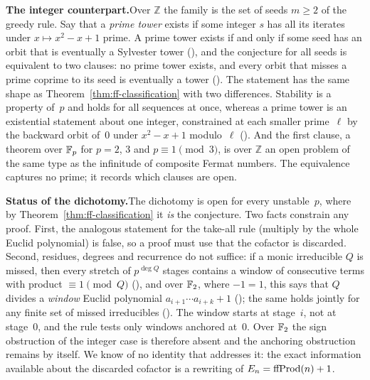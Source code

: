 \smallskip\noindent\textbf{The integer counterpart.}\enspace Over
$\mathbb Z$ the family is the set of seeds $m\ge 2$ of the greedy rule.
Say that a \emph{prime tower} exists if some integer $s$ has all its
iterates under $x\mapsto x^2-x+1$ prime.  A prime tower exists if and
only if some seed has an orbit that is eventually a Sylvester tower
(),
and the conjecture for all seeds is equivalent to two clauses: no prime
tower exists, and every orbit that misses a prime coprime to its seed is
eventually a tower
().
The statement has the same shape as
Theorem~\ref{thm:ff-classification} with two differences.  Stability is a
property of~$p$ and holds for all sequences at once, whereas a prime
tower is an existential statement about one integer, constrained at each
smaller prime~$\ell$ by the backward orbit of~$0$ under $x^2-x+1$
modulo~$\ell$
().
And the first clause, a theorem over $\mathbb{F}_p$ for $p=2$, $3$ and
$p\equiv 1\pmod 3$, is over $\mathbb Z$ an open problem of the same type
as the infinitude of composite Fermat numbers.  The equivalence captures
no prime; it records which clauses are open.

\smallskip\noindent\textbf{Status of the dichotomy.}\enspace The
dichotomy is open for every unstable~$p$, where by
Theorem~\ref{thm:ff-classification} it \emph{is} the conjecture.  Two
facts constrain any proof.  First, the analogous statement for the
take-all rule (multiply by the whole Euclid polynomial) is false, so a
proof must use that the cofactor is discarded.  Second, residues,
degrees and recurrence do not suffice: if a monic irreducible $Q$ is
missed, then every stretch of $p^{\deg Q}$ stages contains a window of
consecutive terms with product $\equiv 1 \pmod Q$
(),
and over $\mathbb{F}_2$, where $-1 = 1$, this says that $Q$ divides a
\emph{window} Euclid polynomial $a_{i+1}\cdots a_{i+k}+1$
();
the same holds jointly for any finite set of missed irreducibles
().
The window starts at stage~$i$, not at stage~$0$, and the rule tests
only windows anchored at~$0$.  Over $\mathbb{F}_2$ the sign obstruction of the
integer case is therefore absent and the anchoring obstruction remains
by itself.  We know of no identity that addresses it: the exact
information available about the discarded cofactor is a rewriting of
$E_n = \mathrm{ffProd}(n)+1$.

